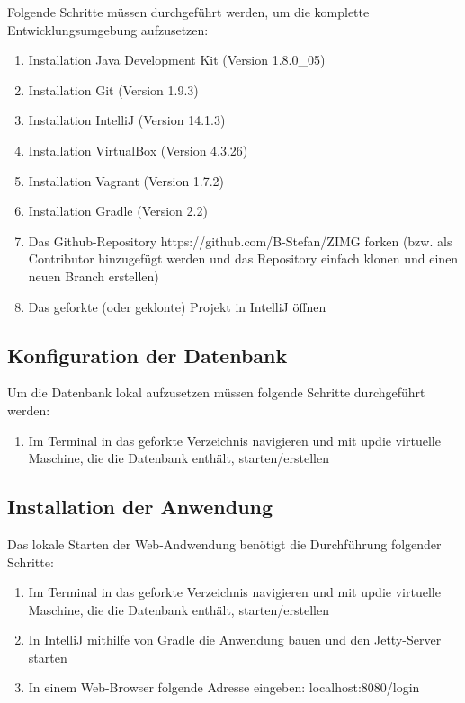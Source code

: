 \documentclass[12pt, oneside, a4paper]{article}		%
\begin{document}
Folgende Schritte müssen durchgeführt werden, um die komplette Entwicklungsumgebung aufzusetzen:

\begin{enumerate}
	\item Installation Java Development Kit (Version 1.8.0_05)
	\item Installation Git (Version 1.9.3)
	\item Installation IntelliJ (Version 14.1.3)
	\item Installation VirtualBox (Version 4.3.26)
	\item Installation Vagrant (Version 1.7.2)
	\item Installation Gradle (Version 2.2)
	\item Das Github-Repository https://github.com/B-Stefan/ZIMG forken (bzw. als Contributor hinzugefügt werden und das Repository einfach klonen und einen neuen Branch erstellen)
	\item Das geforkte (oder geklonte) Projekt in IntelliJ öffnen
\end{enumerate}

\subsection{Konfiguration der Datenbank}

Um die Datenbank lokal aufzusetzen müssen folgende Schritte durchgeführt werden:

\begin{enumerate}
	\item Im Terminal in das geforkte Verzeichnis navigieren und mit \glqqvagrant up\grqq die virtuelle Maschine, die die Datenbank enthält, starten/erstellen
\end{enumerate}

\subsection{Installation der Anwendung}

Das lokale Starten der Web-Andwendung benötigt die Durchführung folgender Schritte:

\begin{enumerate}
	\item Im Terminal in das geforkte Verzeichnis navigieren und mit \glqqvagrant up\grqq die virtuelle Maschine, die die Datenbank enthält, starten/erstellen
	\item In IntelliJ mithilfe von Gradle die Anwendung bauen und den Jetty-Server starten
	\item In einem Web-Browser folgende Adresse eingeben: localhost:8080/login
\end{enumerate}
\end{document}
